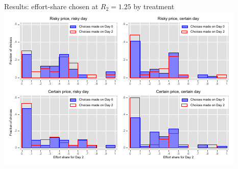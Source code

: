 \documentclass[professionalfont,10pt]{beamer}
\begin{document}
\begin{frame}{Results: effort-share chosen at $R_2=1.25$ by treatment}
\includegraphics[width=\textwidth, trim=0cm 0cm 0cm 0cm, clip]{stata_graphics/effshare_hist_overlaid_bare_3x2.pdf}
\end{frame}
\end{document}
